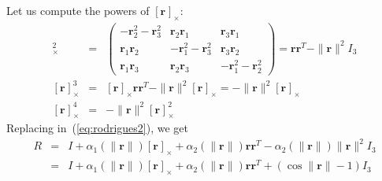 \documentclass {article}
\newcommand\rot{\mathbf{r}}
\newcommand\rcross[1]{[\rot_{#1}]_{\times}}
\newcommand\normr{\|\rot\|}
\begin{document}
Let us compute the powers of $\rcross{}$:
\begin{eqnarray}
\rcross{}^2 &=& \left(\begin{array}{ccc}
-\rot_2^2-\rot_3^2 & \rot_2\rot_1 & \rot_3\rot_1 \\
\rot_1\rot_2 & -\rot_1^2-\rot_3^2 & \rot_3\rot_2 \\
\rot_1\rot_3 & \rot_2\rot_3 & -\rot_1^2-\rot_2^2
\end{array}\right) =
\rot\rot^T - \normr^2 I_3\\
\label{eq:rcross2}
\rcross{}^3 &=& \rcross{}\rot\rot^T - \normr^2 \rcross{} = - \normr^2 \rcross{}\\
\label{eq:rcross3}
\rcross{}^4 &=& - \normr^2 \rcross{}^2
\end{eqnarray}
Replacing in~(\ref{eq:rodrigues2}), we get
\begin{eqnarray}
R &=& I + \alpha_1 (\normr) \rcross{} + \alpha_2 (\normr) \rot\rot^T - \alpha_2 (\normr) \normr^2 I_3\\
\label{eq:rodrigues3}
&=&I + \alpha_1 (\normr) \rcross{} + \alpha_2 (\normr) \rot\rot^T + (\cos\normr-1) I_3
\end{eqnarray}
\end{document}
